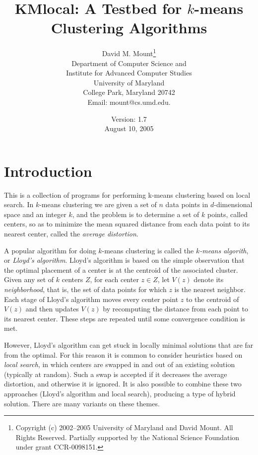 \documentclass[11pt]{article}		%
\begin{document}
\title{KMlocal: A Testbed for $k$-means Clustering Algorithms}
\author{David M. Mount\thanks{Copyright (c) 2002--2005 University of
	Maryland and David Mount. All Rights Reserved.  Partially
	supported by the National Science Foundation under
	grant CCR-0098151.} \\
	Department of Computer Science and \\
	Institute for Advanced Computer Studies \\
	University of Maryland \\
	College Park, Maryland 20742 \\
        Email: mount@cs.umd.edu.}

\date{Version: 1.7 \\
	August 10, 2005}

\maketitle

\section{Introduction}

This is a collection of programs for performing k-means clustering based
on local search.  In $k$-means clustering we are given a set of $n$ data
points in $d$-dimensional space and an integer $k$, and the problem is
to determine a set of $k$ points, called centers, so as to minimize the
mean squared distance from each data point to its nearest center, called
the \emph{average distortion}.

A popular algorithm for doing $k$-means clustering is called the
\emph{$k$-means algorith}, or \emph{Lloyd's algorithm}. Lloyd's
algorithm is based on the simple observation that the optimal placement
of a center is at the centroid of the associated cluster.  Given any set
of $k$ centers $Z$, for each center $z \in Z$, let $V(z)$ denote its
\emph{neighborhood}, that is, the set of data points for which $z$ is the
nearest neighbor.  Each stage of Lloyd's algorithm moves every center
point $z$ to the centroid of $V(z)$ and then updates $V(z)$ by
recomputing the distance from each point to its nearest center.  These
steps are repeated until some convergence condition is met.

However, Lloyd's algorithm can get stuck in locally minimal solutions
that are far from the optimal.  For this reason it is common to consider
heuristics based on \emph{local search}, in which centers are swapped in
and out of an existing solution (typically at random).  Such a swap is
accepted if it decreases the average distortion, and otherwise it is
ignored.  It is also possible to combine these two approaches (Lloyd's
algorithm and local search), producing a type of hybrid solution.  There
are many variants on these themes.
\end{document}
